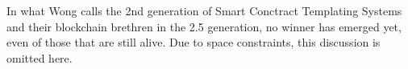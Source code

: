 \documentclass{article}
\begin{document}
In what Wong calls the 2nd generation of Smart Conctract Templating Systems and their blockchain brethren in the 2.5 generation, no winner has emerged yet, even of those that are still alive. Due to space constraints, this discussion is omitted here.
\end{document}
